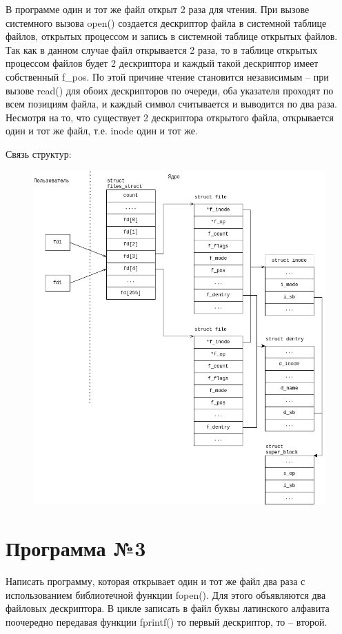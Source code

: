 В программе один и тот же файл открыт 2 раза для чтения.  При вызове системного
вызова open() создается дескриптор файла в системной таблице файлов, открытых
процессом и запись в системной таблице открытых  файлов.  Так как в данном
случае файл открывается 2 раза, то в таблице открытых процессом файлов будет 2
дескриптора и каждый такой дескриптор имеет собственный f\_pos. По этой причине
чтение становится независимым --  при вызове read() для обоих дескрипторов по
очереди, оба указателя проходят по всем позициям файла, и каждый символ
считывается и выводится по два раза.
Несмотря на то, что существует 2 дескриптора открытого файла, открывается один
и тот же файл, т.е. inode один и тот же.

Связь структур:
\begin{figure}[H]
	\centering
	\includegraphics[scale=0.55]{img/d_2.png}
\end{figure}
	
\section*{Программа №3}
Написать программу, которая открывает один и тот же файл два раза с
использованием библиотечной функции fopen(). Для этого объявляются два файловых
дескриптора. В цикле записать в файл буквы латинского алфавита поочередно
передавая функции fprintf() то первый дескриптор, то – второй.

